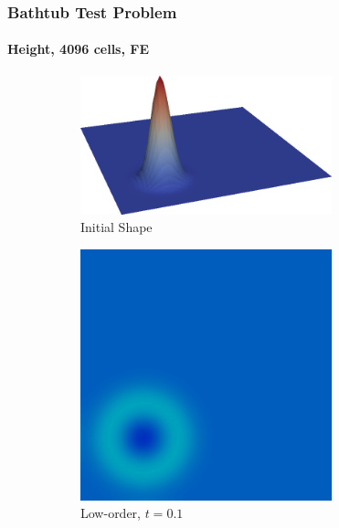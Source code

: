 \begin{frame}
\frametitle{Bathtub Test Problem}
\framesubtitle{Height, 4096 cells, FE}

\begin{figure}[h]
   \centering
   \begin{subfigure}{0.3\textwidth}
      \centering
      \includegraphics[width=0.8\textwidth]{./figures/bathtub_initial_shape.png}
      \caption{Initial Shape}
   \end{subfigure}
   \begin{subfigure}{0.3\textwidth}
      \centering
      \includegraphics[width=0.8\textwidth]{./figures/bathtub_low_t01.png}
      \caption{Low-order, $t=0.1$}
   \end{subfigure}
   \begin{subfigure}{0.3\textwidth}
      \centering

\end{subfigure}
\end{figure}
\end{frame}

